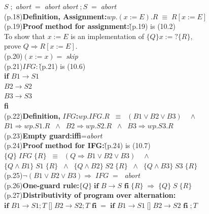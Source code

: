\documentclass{amsart}
\newcommand{\lgap}{2pt}                             %
\newcommand{\equivs}{\ensuremath{\;\equiv\;}}       %
\newcommand{\equivss}{\ensuremath{\;\;\equiv\;\;}}  %
\newcommand{\impl}{\ensuremath{\Rightarrow}}        %
\newcommand{\guard}{[\negthinspace ]}               %
\begin{document}
\begin{tabbing}
       \>$S\;;\;$\emph{abort}$\;=\;$\emph{abort} \>\> \emph{abort}$\;;S\;=\;$\emph{abort}\\[\lgap]
(p.18)\>\textbf{Definition, Assignment:}\quad $wp.(x:=E).R \equivs R[x:=E]$\\[\lgap]
(p.19)\>\textbf{Proof method for assignment:}\`(p.19) is (10.2)\\[\lgap]
      \>To show that $x := E$ is an implementation of $\{Q\}x:=?\{R\}$,\\[\lgap]
      \>prove $Q\impl R[x:=E]$.\\[\lgap]
(p.20)\>$(x:=x)=\;$\emph{skip}\\[\lgap]
(p.21)\>$IFG:$\`(p.21) is (10.6)\\[\lgap]
      \>\textbf{if} $B1\to S1$\\[\lgap]
      \>\guard\: $B2\to S2$\\[\lgap]
      \>\guard\: $B3\to S3$\\[\lgap]
      \>\textbf{fi}\\[\lgap]
(p.22)\>\textbf{Definition, }$IFG$\textbf{:}\quad $wp.IFG.R\equivss (B1\lor B2\lor B3)\quad \land$\\[\lgap]
      \>$B1\impl wp.S1.R \;\;\land \;\;B2\impl wp.S2.R \;\;\land \;\;B3\impl wp.S3.R$\\[\lgap]
(p.23)\>\textbf{Empty guard:}\quad \textbf{if}\;\;\textbf{fi}\;\;=\;\;\emph{abort}\\[\lgap]
(p.24)\>\textbf{Proof method for IFG:}\`(p.24) is (10.7)\\[\lgap]
      \>$\{Q\}\;IFG\;\{R\}\equivss (Q\impl B1\lor B2\lor B3)\quad \land$\\[\lgap]
      \>$\{Q\land B1\}\;S1\;\{R\}\;\;\land\;\; \{Q\land B2\}\;S2\;\{R\}\;\;\land\;\; \{Q\land B3\}\;S3\;\{R\}$\\[\lgap]
(p.25)\>$\neg(B1\lor B2\lor B3)\impl\; IFG\;=\;$ \emph{abort}\\[\lgap]
(p.26)\>\textbf{One-guard rule:}\quad $\{Q\}\;\textbf{if }B\to S\textbf{ fi}\; \{R\}\;\impl\; \{Q\}\;S\; \{R\}$\\[\lgap]
(p.27)\>\textbf{Distributivity of program over alternation:}\quad \\[\lgap]
      \>$\textbf{if }B1\to S1;T\;$\guard$\; B2\to S2;T\textbf{ fi}\; =\; \textbf{if }B1\to S1\;$\guard$\; B2\to S2\textbf{ fi}\;;T$\\[\lgap]

\end{tabbing}
\end{document}
